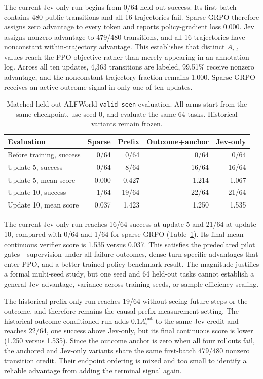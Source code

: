 \documentclass{article}
\begin{document}
The current Jev-only run begins from 0/64 held-out success. Its first batch contains 480 public transitions and all 16 trajectories fail. Sparse GRPO therefore assigns zero advantage to every token and reports policy-gradient loss 0.000. Jev assigns nonzero advantage to 479/480 transitions, and all 16 trajectories have nonconstant within-trajectory advantage. This establishes that distinct $A_{i,t}$ values reach the PPO objective rather than merely appearing in an annotation log. Across all ten updates, 4,363 transitions are labeled, 99.51\% receive nonzero advantage, and the nonconstant-trajectory fraction remains 1.000. Sparse GRPO receives an active outcome signal in only one of ten updates.

\begin{table}[t]
\caption{Matched held-out ALFWorld \texttt{valid\_seen} evaluation. All arms start from the same checkpoint, use seed 0, and evaluate the same 64 tasks. Historical variants remain frozen.}
\label{tab:online-grpo}
\centering
\small
\begin{tabular}{lrrrr}
\toprule
Evaluation & Sparse & Prefix & Outcome+anchor & Jev-only \\
\midrule
Before training, success & 0/64 & 0/64 & 0/64 & 0/64 \\
Update 5, success & 0/64 & 8/64 & 16/64 & 16/64 \\
Update 5, mean score & 0.000 & 0.427 & 1.214 & 1.067 \\
Update 10, success & 1/64 & 19/64 & 22/64 & 21/64 \\
Update 10, mean score & 0.037 & 1.423 & 1.250 & 1.535 \\
\bottomrule
\end{tabular}
\end{table}

The current Jev-only run reaches 16/64 success at update 5 and 21/64 at update 10, compared with 0/64 and 1/64 for sparse GRPO (Table~\ref{tab:online-grpo}). Its final mean continuous verifier score is 1.535 versus 0.037. This satisfies the predeclared pilot gates---supervision under all-failure outcomes, dense turn-specific advantages that enter PPO, and a better trained-policy benchmark result. The magnitude justifies a formal multi-seed study, but one seed and 64 held-out tasks cannot establish a general Jev advantage, variance across training seeds, or sample-efficiency scaling.

The historical prefix-only run reaches 19/64 without seeing future steps or the outcome, and therefore remains the causal-prefix measurement setting. The historical outcome-conditioned run adds $0.1A_i^{\mathrm{out}}$ to the same Jev credit and reaches 22/64, one success above Jev-only, but its final continuous score is lower (1.250 versus 1.535). Since the outcome anchor is zero when all four rollouts fail, the anchored and Jev-only variants share the same first-batch 479/480 nonzero transition credit. Their endpoint ordering is mixed and too small to identify a reliable advantage from adding the terminal signal again.
\end{document}
